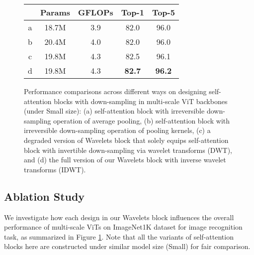 \documentclass[runningheads]{llncs}
\begin{document}
\begin{figure}[!tb]
\vspace{-0.1in}
\qquad
\begin{tabular}[b]{c|cc|cc}
\hline
         &  Params  & GFLOPs  & Top-1 & Top-5 \\ \hline
  a      & 18.7M    & 3.9     & 82.0  & 96.0  \\
  b      & 20.4M    & 4.0     & 82.0  & 96.0  \\
  c      & 19.8M    & 4.3     & 82.5  & 96.1  \\
  d      & 19.8M    & 4.3     & \textbf{82.7}  & \textbf{96.2}  \\ \hline
\end{tabular}
\vspace{-0.16in}
\caption{Performance comparisons across different ways on designing self-attention blocks with down-sampling in multi-scale ViT backbones (under Small size): (a) self-attention block with irreversible down-sampling operation of average pooling, (b) self-attention block with irreversible down-sampling operation of pooling kernels, (c) a degraded version of Wavelets block that solely equips self-attention block with invertible down-sampling via wavelet transforms (DWT), and (d) the full version of our Wavelets block with inverse wavelet transforms (IDWT).}
\label{fig:ablation}
\vspace{-0.2in}
\end{figure}

\subsection{Ablation Study}

We investigate how each design in our Wavelets block influences the overall performance of multi-scale ViTs on ImageNet1K dataset for image recognition task, as summarized in Figure \ref{fig:ablation}. Note that all the variants of self-attention blocks here are constructed under similar model size (Small) for fair comparison.
\end{document}
